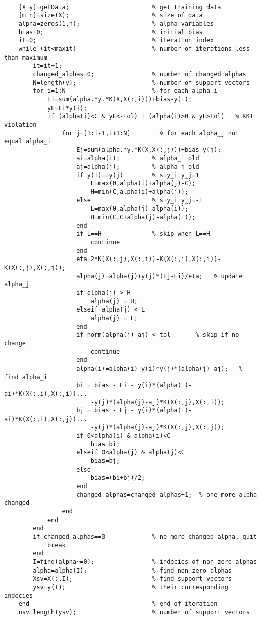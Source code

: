 \documentclass{article}
\begin{document}
\begin{verbatim}

    [X y]=getData;                       % get training data
    [m n]=size(X);                       % size of data
    alpha=zeros(1,n);                    % alpha variables
    bias=0;                              % initial bias
    it=0;                                % iteration index                
    while (it<maxit)                     % number of iterations less than maximum
        it=it+1;
        changed_alphas=0;                % number of changed alphas
        N=length(y);                     % number of support vectors
        for i=1:N                        % for each alpha_i
            Ei=sum(alpha.*y.*K(X,X(:,i)))+bias-y(i);    
            yE=Ei*y(i);
            if (alpha(i)<C & yE<-tol) | (alpha(i)>0 & yE>tol)   % KKT violation
                for j=[1:i-1,i+1:N]        % for each alpha_j not equal alpha_i
                    Ej=sum(alpha.*y.*K(X,X(:,j)))+bias-y(j);
                    ai=alpha(i);         % alpha_i old
                    aj=alpha(j);         % alpha_j old
                    if y(i)==y(j)        % s=y_i y_j=1
                        L=max(0,alpha(i)+alpha(j)-C);
                        H=min(C,alpha(i)+alpha(j));
                    else                 % s=y_i y_j=-1
                        L=max(0,alpha(j)-alpha(i));
                        H=min(C,C+alpha(j)-alpha(i));
                    end
                    if L==H              % skip when L==H
                        continue
                    end
                    eta=2*K(X(:,j),X(:,i))-K(X(:,i),X(:,i))-K(X(:,j),X(:,j));
                    alpha(j)=alpha(j)+y(j)*(Ej-Ei)/eta;   % update alpha_j
                    if alpha(j) > H
                        alpha(j) = H;
                    elseif alpha(j) < L
                        alpha(j) = L;
                    end
                    if norm(alpha(j)-aj) < tol       % skip if no change
                        continue
                    end
                    alpha(i)=alpha(i)-y(i)*y(j)*(alpha(j)-aj);   % find alpha_i
                    bi = bias - Ei - y(i)*(alpha(i)-ai)*K(X(:,i),X(:,i))...
                        -y(j)*(alpha(j)-aj)*K(X(:,j),X(:,i));
                    bj = bias - Ej - y(i)*(alpha(i)-ai)*K(X(:,i),X(:,j))...
                        -y(j)*(alpha(j)-aj)*K(X(:,j),X(:,j));   
                    if 0<alpha(i) & alpha(i)<C
                        bias=bi;
                    elseif 0<alpha(j) & alpha(j)<C
                        bias=bj;
                    else
                        bias=(bi+bj)/2;
                    end
                    changed_alphas=changed_alphas+1;  % one more alpha changed
                end
            end
        end
        if changed_alphas==0             % no more changed alpha, quit
            break
        end
        I=find(alpha~=0);                % indecies of non-zero alphas
        alpha=alpha(I);                  % find non-zero alphas
        Xsv=X(:,I);                      % find support vectors
        ysv=y(I);                        % their corresponding indecies
    end                                  % end of iteration
    nsv=length(ysv);                     % number of support vectors
\end{verbatim}
\end{document}
